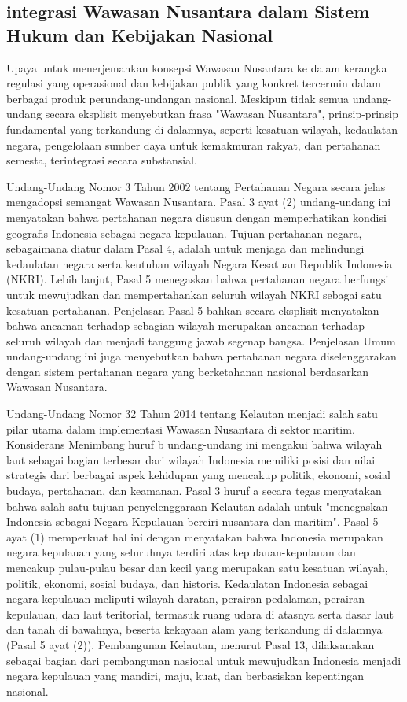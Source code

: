\documentclass[12pt, a4paper]{article}
\begin{document}
\subsection*{integrasi Wawasan Nusantara dalam Sistem Hukum dan Kebijakan Nasional}

Upaya untuk menerjemahkan konsepsi Wawasan Nusantara ke dalam kerangka regulasi yang operasional dan kebijakan publik yang konkret tercermin dalam berbagai produk perundang-undangan nasional. Meskipun tidak semua undang-undang secara eksplisit menyebutkan frasa "Wawasan Nusantara", prinsip-prinsip fundamental yang terkandung di dalamnya, seperti kesatuan wilayah, kedaulatan negara, pengelolaan sumber daya untuk kemakmuran rakyat, dan pertahanan semesta, terintegrasi secara substansial.

Undang-Undang Nomor 3 Tahun 2002 tentang Pertahanan Negara secara jelas mengadopsi semangat Wawasan Nusantara. Pasal 3 ayat (2) undang-undang ini menyatakan bahwa pertahanan negara disusun dengan memperhatikan kondisi geografis Indonesia sebagai negara kepulauan. Tujuan pertahanan negara, sebagaimana diatur dalam Pasal 4, adalah untuk menjaga dan melindungi kedaulatan negara serta keutuhan wilayah Negara Kesatuan Republik Indonesia (NKRI). Lebih lanjut, Pasal 5 menegaskan bahwa pertahanan negara berfungsi untuk mewujudkan dan mempertahankan seluruh wilayah NKRI sebagai satu kesatuan pertahanan. Penjelasan Pasal 5 bahkan secara eksplisit menyatakan bahwa ancaman terhadap sebagian wilayah merupakan ancaman terhadap seluruh wilayah dan menjadi tanggung jawab segenap bangsa. Penjelasan Umum undang-undang ini juga menyebutkan bahwa pertahanan negara diselenggarakan dengan sistem pertahanan negara yang berketahanan nasional berdasarkan Wawasan Nusantara.  

Undang-Undang Nomor 32 Tahun 2014 tentang Kelautan menjadi salah satu pilar utama dalam implementasi Wawasan Nusantara di sektor maritim. Konsiderans Menimbang huruf b undang-undang ini mengakui bahwa wilayah laut sebagai bagian terbesar dari wilayah Indonesia memiliki posisi dan nilai strategis dari berbagai aspek kehidupan yang mencakup politik, ekonomi, sosial budaya, pertahanan, dan keamanan. Pasal 3 huruf a secara tegas menyatakan bahwa salah satu tujuan penyelenggaraan Kelautan adalah untuk "menegaskan Indonesia sebagai Negara Kepulauan berciri nusantara dan maritim". Pasal 5 ayat (1) memperkuat hal ini dengan menyatakan bahwa Indonesia merupakan negara kepulauan yang seluruhnya terdiri atas kepulauan-kepulauan dan mencakup pulau-pulau besar dan kecil yang merupakan satu kesatuan wilayah, politik, ekonomi, sosial budaya, dan historis. Kedaulatan Indonesia sebagai negara kepulauan meliputi wilayah daratan, perairan pedalaman, perairan kepulauan, dan laut teritorial, termasuk ruang udara di atasnya serta dasar laut dan tanah di bawahnya, beserta kekayaan alam yang terkandung di dalamnya (Pasal 5 ayat (2)). Pembangunan Kelautan, menurut Pasal 13, dilaksanakan sebagai bagian dari pembangunan nasional untuk mewujudkan Indonesia menjadi negara kepulauan yang mandiri, maju, kuat, dan berbasiskan kepentingan nasional.  
\end{document}
